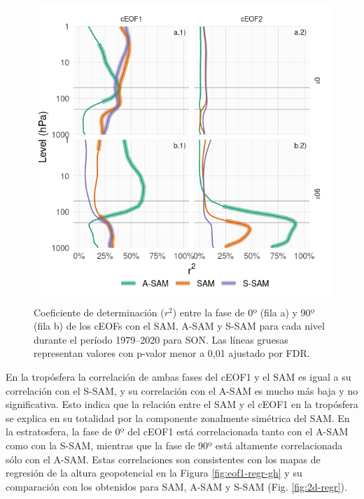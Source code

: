 \documentclass[12pt,oneside,a4paper]{reedthesis}
\begin{document}
\begin{figure}

{\centering \includegraphics{figures/30-sam/sam-eof-vertical-1} 

}

\caption{Coeficiente de determinación (\(r^2\)) entre la fase de 0º (fila a) y 90º (fila b) de los cEOFs con el SAM, A-SAM y S-SAM para cada nivel durante el período 1979--2020 para SON. Las líneas gruesas representan valores con p-valor menor a 0,01 ajustado por FDR.}\label{fig:sam-eof-vertical}
\end{figure}

En la tropósfera la correlación de ambas fases del cEOF1 y el SAM es igual a su correlación con el S-SAM, y su correlación con el A-SAM es mucho más baja y no significativa.
Esto indica que la relación entre el SAM y el cEOF1 en la tropósfera se explica en su totalidad por la componente zonalmente simétrica del SAM.
En la estratosfera, la fase de 0º del cEOF1 está correlacionada tanto con el A-SAM como con la S-SAM, mientras que la fase de 90º está altamente correlacionada sólo con el A-SAM.
Estas correlaciones son consistentes con los mapas de regresión de la altura geopotencial en la Figura \ref{fig:eof1-regr-gh} y su comparación con los obtenidos para SAM, A-SAM y S-SAM (Fig. \ref{fig:2d-regr}).
\end{document}
